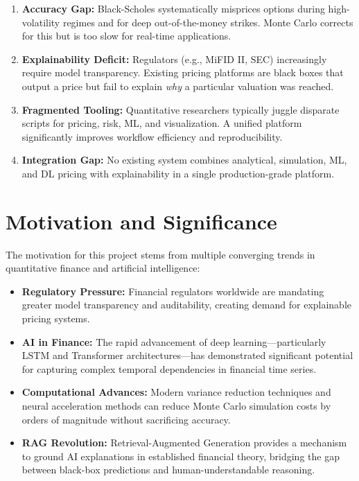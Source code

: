 \documentclass[12pt,a4paper]{report}
\begin{document}
\begin{enumerate}
    \item \textbf{Accuracy Gap:} Black-Scholes systematically misprices options during high-volatility regimes and for deep out-of-the-money strikes. Monte Carlo corrects for this but is too slow for real-time applications.
    \item \textbf{Explainability Deficit:} Regulators (e.g., MiFID II, SEC) increasingly require model transparency. Existing pricing platforms are black boxes that output a price but fail to explain \textit{why} a particular valuation was reached.
    \item \textbf{Fragmented Tooling:} Quantitative researchers typically juggle disparate scripts for pricing, risk, ML, and visualization. A unified platform significantly improves workflow efficiency and reproducibility.
    \item \textbf{Integration Gap:} No existing system combines analytical, simulation, ML, and DL pricing with explainability in a single production-grade platform.
\end{enumerate}

\section{Motivation and Significance}

The motivation for this project stems from multiple converging trends in quantitative finance and artificial intelligence:

\begin{itemize}
    \item \textbf{Regulatory Pressure:} Financial regulators worldwide are mandating greater model transparency and auditability, creating demand for explainable pricing systems.
    \item \textbf{AI in Finance:} The rapid advancement of deep learning---particularly LSTM and Transformer architectures---has demonstrated significant potential for capturing complex temporal dependencies in financial time series.
    \item \textbf{Computational Advances:} Modern variance reduction techniques and neural acceleration methods can reduce Monte Carlo simulation costs by orders of magnitude without sacrificing accuracy.
    \item \textbf{RAG Revolution:} Retrieval-Augmented Generation provides a mechanism to ground AI explanations in established financial theory, bridging the gap between black-box predictions and human-understandable reasoning.
\end{itemize}
\end{document}
